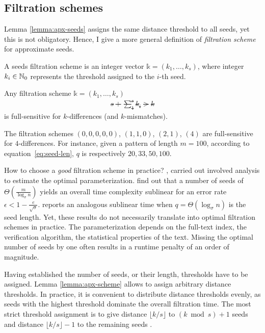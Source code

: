 \subsection{Filtration schemes}

Lemma \ref{lemma:apx-seeds} assigns the same distance threshold to all seeds, yet this is not obligatory.
Hence, I give a more general definition of \emph{filtration scheme} for approximate seeds.
\begin{definition}
A seeds filtration scheme is an integer vector $\mathbb{k} = (k_1, \dots, k_s)$, where integer $k_i \in \mathbb {N}_0$ represents the threshold assigned to the $i$-th seed.
\end{definition}

\begin{lemma}
\label{lemma:apx-scheme}
Any filtration scheme $\mathbb{k} = (k_1, \dots, k_s)$ \st
\begin{eqnarray}
s + \sum_1^s k_i > k
\end{eqnarray}
is full-sensitive for $k$-differences (and $k$-mismatches).
\end{lemma}

\begin{example}
\label{ex:seeds-apx-scheme}
The filtration schemes $(0,0,0,0,0)$, $(1,1,0)$, $(2,1)$, $(4)$ are full-sensitive for $4$-differences.
For instance, given a pattern of length $m=100$, according to equation~\ref{eq:seed-len}, $q$ is respectively $20, 33, 50, 100$.
\end{example}

How to choose a \emph{good} filtration scheme in practice?
\citeauthor{Myers1994}, \citeauthor{Navarro2000} carried out involved analysis to estimate the optimal parameterization. \citeauthor{Navarro2000} find out that a number of seeds of $\Theta(\frac{m}{\log_{\sigma}{n}})$ yields an overall time complexity sublinear for an error rate $\epsilon < 1 - \frac{e}{\sqrt{\sigma}}$.
\citeauthor{Myers1994} reports an analogous sublinear time when $q=\Theta(\log_{\sigma}{n})$ is the seed length.
Yet, these results do not necessarily translate into optimal filtration schemes in practice.
The parameterization depends on the full-text index, the verification algorithm, the statistical properties of the text.
Missing the optimal number of seeds by one often results in a runtime penalty of an order of magnitude.

Having established the number of seeds, or their length, thresholds have to be assigned.
Lemma \ref{lemma:apx-scheme} allows to assign arbitrary distance thresholds.
In practice, it is convenient to distribute distance thresholds evenly, as seeds with the highest threshold dominate the overall filtration time.
The most strict threshold assignment is to give distance $\lfloor k/s \rfloor$ to $(k \bmod{s}) + 1$ seeds and distance $\lfloor k/s \rfloor - 1$ to the remaining seeds \citep{Siragusa2013}.

